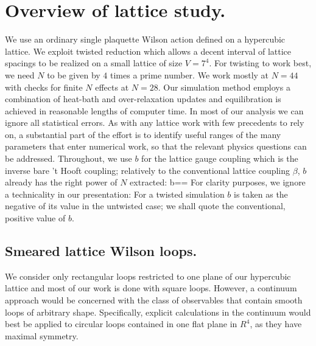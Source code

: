 \section{Overview of lattice study.}

We use an ordinary single plaquette Wilson action defined on a
hypercubic lattice. We exploit twisted reduction \cite{twist8}
which allows a decent interval of lattice spacings to be realized
on a small lattice of size $V=7^4$.
For twisting to work
best, we need $N$ to be given by $4$ times a prime number.
We work mostly at $N=44$ with
checks for finite $N$ effects at $N=28$.
Our simulation method
employs a combination of heat-bath and over-relaxation updates and
equilibration is achieved in reasonable lengths of computer time.
In most of our analysis we can ignore all statistical errors.
As with any lattice work with few
precedents to rely on, a substantial part of the effort is to
identify useful ranges of the many parameters that enter numerical
work, so that the relevant physics questions can be addressed.
Throughout, we use $b$ for the lattice gauge coupling which is the
inverse bare 't Hooft coupling; relatively to the conventional
lattice coupling $\beta$, $b$ already has the right power of $N$
extracted:
\be
b==\ee
For clarity purposes, we ignore a technicality in our
presentation:
For a twisted simulation $b$ is taken as the
negative of its value in the untwisted case; we shall quote the
conventional, positive value of $b$.

\subsection{Smeared lattice Wilson loops.}

We consider only rectangular loops restricted to one plane of our
hypercubic lattice and most of our work is done with square loops.
However, a continuum approach would
be concerned with the class of
observables that contain smooth loops of arbitrary shape.
Specifically, explicit calculations in the continuum would best be applied to
circular loops contained in one flat plane in $R^4$, as they have
maximal symmetry.


